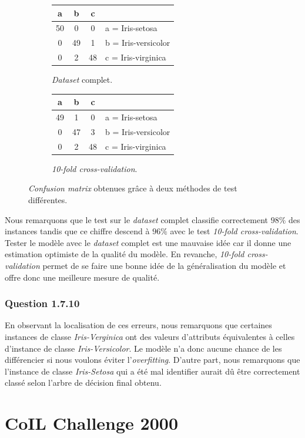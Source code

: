 \documentclass[10pt,a4paper]{article}
\begin{document}
	   			\begin{figure}[h]
	   				\centering
					\begin{subfigure}{0.4\textwidth}
						\centering
						\begin{tabular}{|c|c|c|l|}
							\hline
							a & b & c & \\ 
							\hline
							50 & 0 & 0 & a = Iris-setosa\\
							\hline
							0 & 49 & 1 & b = Iris-versicolor\\
							\hline
							0 & 2 & 48 & c = Iris-virginica\\
							\hline
						\end{tabular}
						\caption{\textit{Dataset} complet.}
					\end{subfigure}%
					\begin{subfigure}{0.4\textwidth}
						\centering
						\begin{tabular}{|c|c|c|l|}
							\hline
							a & b & c & \\ 
							\hline
							49 & 1 & 0 & a = Iris-setosa\\
							\hline
							0 & 47 & 3 & b = Iris-versicolor\\
							\hline
							0 & 2 & 48 & c = Iris-virginica\\
							\hline
						\end{tabular}
						\caption{\textit{10-fold cross-validation}.}
					\end{subfigure}
					\caption{\textit{Confusion matrix} obtenues grâce à deux méthodes de test différentes.}
	   			\end{figure}
 
				 Nous remarquons que le test sur le \textit{dataset} complet classifie correctement $98\%$ des instances tandis que ce chiffre descend à $96\%$ avec le test \textit{10-fold cross-validation}. Tester le modèle avec le \textit{dataset} complet est une mauvaise idée car il donne une estimation optimiste de la qualité du modèle. En revanche, \textit{10-fold cross-validation} permet de se faire une bonne idée de la généralisation du modèle et offre donc une meilleure mesure de qualité.
				 
			\subsubsection*{Question 1.7.10}
			
				En observant la localisation de ces erreurs, nous remarquons que certaines instances de classe \textit{Iris-Verginica} ont des valeurs d'attributs équivalentes à celles d'instance de classe \textit{Iris-Versicolor}. Le modèle n'a donc aucune chance de les différencier si nous voulons éviter l'\textit{overfitting}. D'autre part, nous remarquons que l'instance de classe \textit{Iris-Setosa} qui a été mal identifier aurait dû être correctement classé selon l'arbre de décision final obtenu. 
   	
   	\section{CoIL Challenge 2000}
   	
          	
\end{document}
